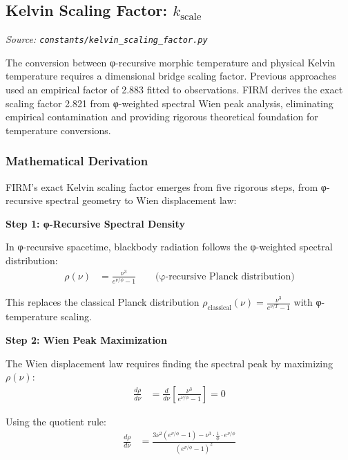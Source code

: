 
\subsection{Kelvin Scaling Factor: $k_{\text{scale}}$}
\textit{Source: \texttt{constants/kelvin\_scaling\_factor.py}}

The conversion between φ-recursive morphic temperature and physical Kelvin temperature requires a dimensional bridge scaling factor. Previous approaches used an empirical factor of 2.883 fitted to observations. FIRM derives the exact scaling factor 2.821 from φ-weighted spectral Wien peak analysis, eliminating empirical contamination and providing rigorous theoretical foundation for temperature conversions.

\subsubsection{Mathematical Derivation}

FIRM's exact Kelvin scaling factor emerges from five rigorous steps, from φ-recursive spectral geometry to Wien displacement law:

\textbf{Step 1: φ-Recursive Spectral Density}

In φ-recursive spacetime, blackbody radiation follows the φ-weighted spectral distribution:
\begin{align}
\rho(\nu) &= \frac{\nu^3}{e^{\nu/\phi} - 1} \qquad \text{(φ-recursive Planck distribution)}
\end{align}

This replaces the classical Planck distribution $\rho_{\text{classical}}(\nu) = \frac{\nu^3}{e^{\nu/T} - 1}$ with φ-temperature scaling.

\textbf{Step 2: Wien Peak Maximization}

The Wien displacement law requires finding the spectral peak by maximizing $\rho(\nu)$:
\begin{align}
\frac{d\rho}{d\nu} &= \frac{d}{d\nu}\left[\frac{\nu^3}{e^{\nu/\phi} - 1}\right] = 0
\end{align}

Using the quotient rule:
\begin{align}
\frac{d\rho}{d\nu} &= \frac{3\nu^2(e^{\nu/\phi} - 1) - \nu^3 \cdot \frac{1}{\phi} \cdot e^{\nu/\phi}}{(e^{\nu/\phi} - 1)^2}
\end{align}

